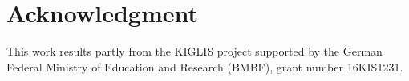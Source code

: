 \section{Acknowledgment}
\label{sec:acknowledgment}

This work results partly from the KIGLIS project supported by the German Federal Ministry of Education and Research (BMBF), grant number 16KIS1231.